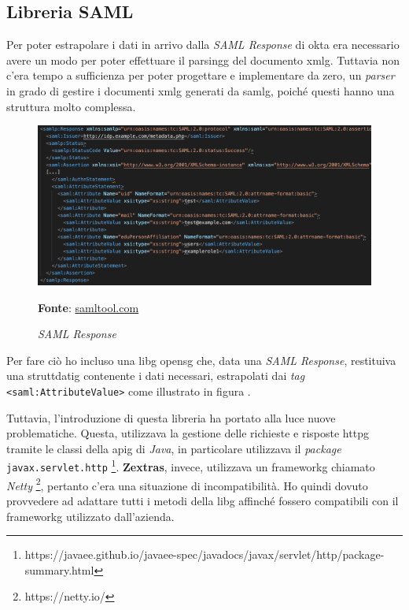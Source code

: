 \subsection{Libreria SAML} \label{sec:libreria}
Per poter estrapolare i dati in arrivo dalla \textit{SAML Response} di \gls{okta} era necessario avere un modo per poter effettuare il \gls{parsingg} del documento \gls{xmlg}. Tuttavia non c'era tempo a sufficienza per poter progettare e implementare da zero, un \textit{parser} in grado di gestire i documenti \gls{xmlg} generati da \gls{samlg}, poiché questi hanno una struttura molto complessa.

    \begin{figure}[ht]
        \centering
        \includegraphics[width=1\textwidth]{immagini/saml_response.png}
        \caption{\textit{SAML Response}}
        \textbf{Fonte}:
        \href{https://www.samltool.com/generic_sso_res.php}{samltool.com}
        \label{fig: SAML Response}
    \end{figure}
    
Per fare ciò ho incluso una \gls{libg} \gls{opensg} che, data una \textit{SAML Response}, restituiva una \gls{struttdatig} contenente i dati necessari, estrapolati dai \textit{tag} \texttt{<saml:AttributeValue>} come illustrato in figura .

\newpage

Tuttavia, l'introduzione di questa libreria ha portato alla luce nuove problematiche. Questa, utilizzava la gestione delle richieste e risposte \gls{httpg} tramite le classi della \gls{apig} di \textit{Java}, in particolare utilizzava il \textit{package} \texttt{javax.servlet.http} \footnote{https://javaee.github.io/javaee-spec/javadocs/javax/servlet/http/package-summary.html}. \textbf{Zextras}, invece, utilizzava un \gls{frameworkg} chiamato \textit{Netty} \footnote{https://netty.io/}, pertanto c'era una situazione di incompatibilità. Ho quindi dovuto provvedere ad adattare tutti i metodi della \gls{libg} affinché fossero compatibili con il \gls{frameworkg} utilizzato dall'azienda. \\

